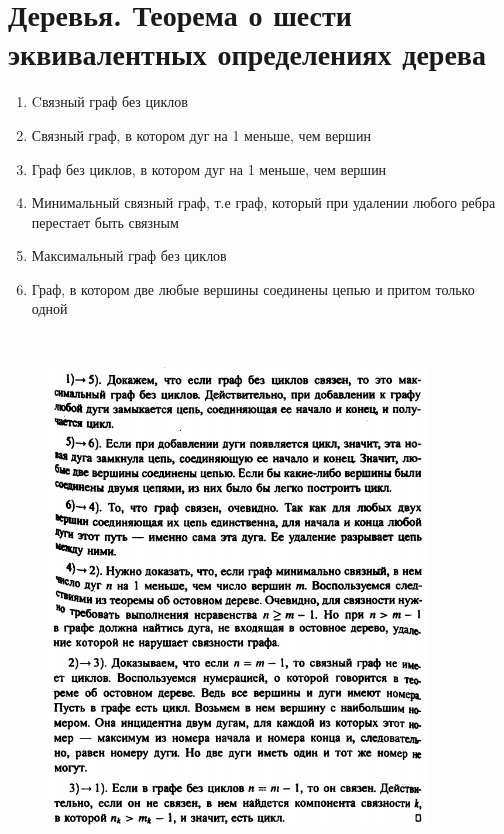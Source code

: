 \documentclass[discrete.tex]{subfiles}
\begin{document}
\section{Деревья. Теорема о шести эквивалентных определениях дерева}

\begin{theorem}
    \begin{enumerate}
        \item Cвязный граф без циклов
        \item Связный граф, в котором дуг на 1 меньше, чем вершин
        \item Граф без циклов, в котором дуг на 1 меньше, чем вершин
        \item Минимальный связный граф, т.е граф, который при удалении любого ребра перестает быть связным
        \item Максимальный граф без циклов
        \item Граф, в котором две любые вершины соединены цепью и притом только одной
    \end{enumerate}
\end{theorem}

\begin{Proof} \
  \begin{figure}[H]
          \includegraphics[width=10cm]{pics/42_1}
          \centering
  \end{figure}
\end{Proof}
\end{document}
